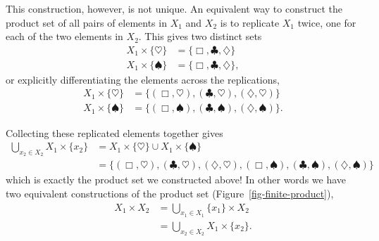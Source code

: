 \documentclass[
  letterpaper,
  DIV=11,
  numbers=noendperiod]{scrartcl}
\begin{document}
This construction, however, is not unique. An equivalent way to
construct the product set of all pairs of elements in \(X_{1}\) and
\(X_{2}\) is to replicate \(X_{1}\) twice, one for each of the two
elements in \(X_{2}\). This gives two distinct sets \begin{align*}
X_{1} \times \{ \heartsuit \}
&=
\{ \Box, \clubsuit, \diamondsuit \}
\\
X_{1} \times \{ \spadesuit \}
&=
\{ \Box, \clubsuit, \diamondsuit \},
\end{align*} or explicitly differentiating the elements across the
replications, \begin{align*}
X_{1} \times \{ \heartsuit \}
&=
\{ (\Box, \heartsuit), (\clubsuit, \heartsuit), (\diamondsuit, \heartsuit) \}
\\
X_{1} \times \{ \spadesuit \}
&=
\{ (\Box, \spadesuit), (\clubsuit, \spadesuit), (\diamondsuit, \spadesuit) \}.
\end{align*}

Collecting these replicated elements together gives \begin{align*}
\bigcup_{x_{2} \in X_{2}} X_{1} \times \{ x_{2} \}
&=
X_{1} \times \{ \heartsuit \}  \cup X_{1} \times \{ \spadesuit \}
\\
&=
\{ (\Box, \heartsuit), (\clubsuit, \heartsuit), (\diamondsuit, \heartsuit),
(\Box, \spadesuit), (\clubsuit, \spadesuit), (\diamondsuit, \spadesuit) \}
\end{align*} which is exactly the product set we constructed above! In
other words we have two equivalent constructions of the product set
(Figure~\ref{fig-finite-product}), \begin{align*}
X_{1} \times X_{2}
&=
\bigcup_{x_{1} \in X_{1}} \{ x_{1} \} \times X_{2}
\\
&=
\bigcup_{x_{2} \in X_{2}} X_{1} \times \{ x_{2} \}.
\end{align*}
\end{document}
